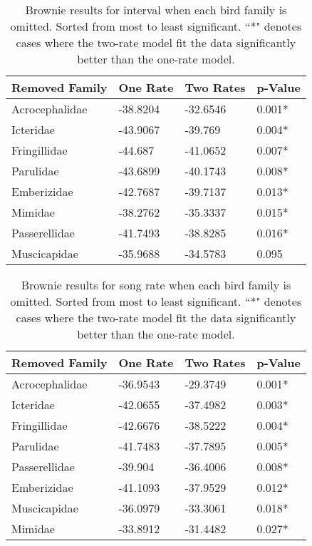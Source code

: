 \documentclass[a4paper,12pt]{article}
\begin{document}
\begin{table}[ht]
\caption{Brownie results for interval when each bird family is omitted.  Sorted from most to least significant.  ``*" denotes cases where the two-rate model fit the data significantly better than the one-rate model.}
\centering
\begin{tabular}{llll}
  \hline
Removed Family & One Rate & Two Rates & p-Value \\ 
  \hline
Acrocephalidae & -38.8204 & -32.6546 & 0.001* \\ 
  Icteridae & -43.9067 & -39.769 & 0.004* \\ 
  Fringillidae & -44.687 & -41.0652 & 0.007* \\ 
  Parulidae & -43.6899 & -40.1743 & 0.008* \\ 
  Emberizidae & -42.7687 & -39.7137 & 0.013* \\ 
  Mimidae & -38.2762 & -35.3337 & 0.015* \\ 
  Passerellidae & -41.7493 & -38.8285 & 0.016* \\ 
  Muscicapidae & -35.9688 & -34.5783 & 0.095 \\ 
   \hline
\end{tabular}
\end{table}

\begin{table}[ht]
\caption{Brownie results for song rate when each bird family is omitted.  Sorted from most to least significant.  ``*" denotes cases where the two-rate model fit the data significantly better than the one-rate model.}
\centering
\begin{tabular}{llll}
  \hline
Removed Family & One Rate & Two Rates & p-Value \\ 
  \hline
Acrocephalidae & -36.9543 & -29.3749 & 0.001* \\ 
  Icteridae & -42.0655 & -37.4982 & 0.003* \\ 
  Fringillidae & -42.6676 & -38.5222 & 0.004* \\ 
  Parulidae & -41.7483 & -37.7895 & 0.005* \\ 
  Passerellidae & -39.904 & -36.4006 & 0.008* \\ 
  Emberizidae & -41.1093 & -37.9529 & 0.012* \\ 
  Muscicapidae & -36.0979 & -33.3061 & 0.018* \\ 
  Mimidae & -33.8912 & -31.4482 & 0.027* \\ 
   \hline
\end{tabular}
\end{table}
\end{document}
